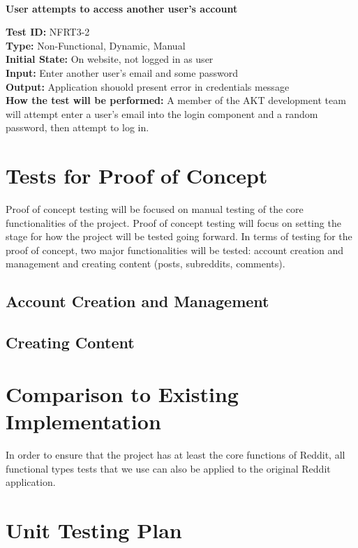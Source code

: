 \documentclass[12pt,fleqn]{article}
\begin{document}
\newpage

\textbf{\\User attempts to access another user's account}
\begin{tcolorbox}
\textbf{Test ID:} NFRT3-2\\
\textbf{Type:} Non-Functional, Dynamic, Manual\\
\textbf{Initial State:} On website, not logged in as user \\
\textbf{Input:} Enter another user's email and some password \\
\textbf{Output:} Application shouold present error in credentials message\\
\textbf{How the test will be performed:} A member of the AKT development team will attempt enter a user's email into the login component and a random password, then attempt to log in.
\end{tcolorbox}

\section{Tests for Proof of Concept}
Proof of concept testing will be focused on manual testing of the core functionalities of the project.  Proof of concept testing will focus on setting the stage for how the project will be tested going forward.  In terms of testing for the proof of concept, two major functionalities will be tested: account creation and management and creating content (posts, subreddits, comments).

\subsection{Account Creation and Management}
\subsection{Creating Content}



\section{Comparison to Existing Implementation}
In order to ensure that the project has at least the core functions of Reddit, all functional types tests that we use can also be applied to the original Reddit application.

\section{Unit Testing Plan}
\end{document}
